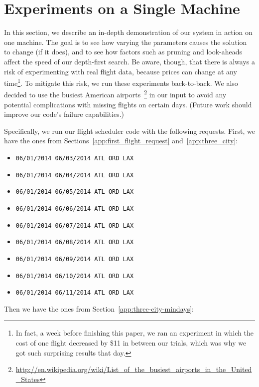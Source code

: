 \documentclass{article}
\begin{document}
\newpage
\section{Experiments on a Single Machine}\label{app:single_machine_experiment}

In this section, we describe an in-depth demonstration of our system in action on one machine. The goal is to see how varying the parameters causes
the solution to change (if it does), and to see how factors such as pruning and look-aheads affect the speed of our depth-first search. Be aware,
though, that there is always a risk of experimenting with real flight data, because prices can change at any time\footnote{In fact, a week before
finishing this paper, we ran an experiment in which the cost of one flight decreased by \$11 in between our trials, which was why we got such
surprising results that day.}. To mitigate this risk, we run these experiments back-to-back. We also decided to use the busiest American
airports~\footnote{\url{http://en.wikipedia.org/wiki/List\_of\_the\_busiest\_airports\_in\_the\_United\_States}} in our input to avoid any potential
complications with missing flights on certain days. (Future work should improve our code's failure capabilities.)

Specifically, we run our flight scheduler code with the following requests. First, we have the ones from Sections~\ref{app:first_flight_request}
and~\ref{app:three_city}:

\begin{itemize}[noitemsep]
    \item \texttt{06/01/2014 06/03/2014 ATL ORD LAX}
    \item \texttt{06/01/2014 06/04/2014 ATL ORD LAX}
    \item \texttt{06/01/2014 06/05/2014 ATL ORD LAX}
    \item \texttt{06/01/2014 06/06/2014 ATL ORD LAX}
    \item \texttt{06/01/2014 06/07/2014 ATL ORD LAX}
    \item \texttt{06/01/2014 06/08/2014 ATL ORD LAX}
    \item \texttt{06/01/2014 06/09/2014 ATL ORD LAX}
    \item \texttt{06/01/2014 06/10/2014 ATL ORD LAX}
    \item \texttt{06/01/2014 06/11/2014 ATL ORD LAX}
\end{itemize}

Then we have the ones from Section~\ref{app:three-city-mindays}:
\end{document}
